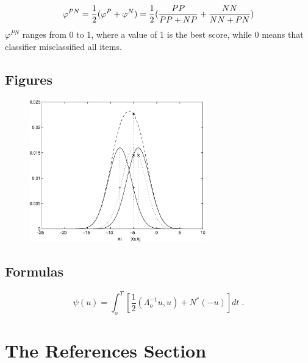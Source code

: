 \documentclass[runningheads,a4paper]{llncs}
\begin{document}
\begin{equation}
\varphi^{PN} = \frac{1}{2}(\varphi^P + \varphi^N) \\
= \frac{1}{2}(\frac{PP}{PP + NP} + \frac{NN}{NN + PN})
\end{equation}
$\varphi^{PN}$ ranges from 0 to 1, where a value of 1 is the best score, while 0 means that classifier misclassified all items. 

\subsection{Figures}



\begin{figure}
\centering
\includegraphics[height=6.2cm]{eijkel2}
\caption{}
\label{fig:example}
\end{figure}



\subsection{Formulas}

\begin{equation}
  \psi (u) = \int_{o}^{T} \left[\frac{1}{2}
  \left(\Lambda_{o}^{-1} u,u\right) + N^{\ast} (-u)\right] dt \;  .
\end{equation}


\section{The References Section}\label{references}
\end{document}
